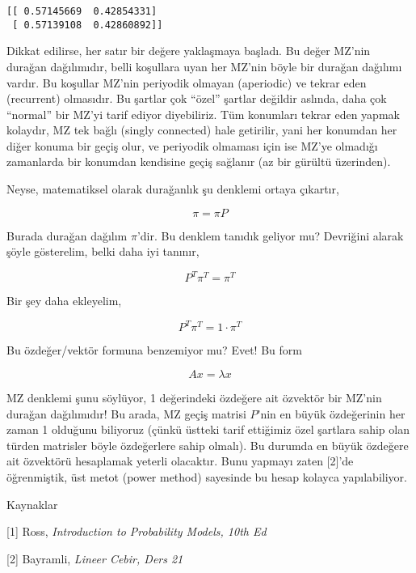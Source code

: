 \documentclass[12pt,fleqn]{article}\usepackage{../../common}
\begin{document}
\begin{verbatim}
[[ 0.57145669  0.42854331]
 [ 0.57139108  0.42860892]]
\end{verbatim}

Dikkat edilirse, her satır bir değere yaklaşmaya başladı. Bu değer MZ'nin
durağan dağılımıdır, belli koşullara uyan her MZ'nin böyle bir durağan
dağılımı vardır. Bu koşullar MZ'nin periyodik olmayan (aperiodic) ve tekrar
eden (recurrent) olmasıdır. Bu şartlar çok ``özel'' şartlar değildir
aslında, daha çok ``normal'' bir MZ'yi tarif ediyor diyebiliriz. Tüm
konumları tekrar eden yapmak kolaydır, MZ tek bağlı (singly connected) hale
getirilir, yani her konumdan her diğer konuma bir geçiş olur, ve periyodik
olmaması için ise MZ'ye olmadığı zamanlarda bir konumdan kendisine geçiş
sağlanır (az bir gürültü üzerinden). 

Neyse, matematiksel olarak durağanlık şu denklemi ortaya çıkartır,

$$ \pi = \pi P $$

Burada durağan dağılım $\pi$'dir. Bu denklem tanıdık geliyor mu?  Devriğini
alarak şöyle gösterelim, belki daha iyi tanınır, 

$$ P^T\pi^T = \pi^T $$

Bir şey daha ekleyelim, 

$$ P^T\pi^T = 1 \cdot \pi^T $$

Bu özdeğer/vektör formuna benzemiyor mu? Evet! Bu form 

$$ Ax = \lambda x $$

MZ denklemi şunu söylüyor, 1 değerindeki özdeğere ait özvektör bir MZ'nin
durağan dağılımıdır! Bu arada, MZ geçiş matrisi $P$'nin en büyük
özdeğerinin her zaman 1 olduğunu biliyoruz (çünkü üstteki tarif ettiğimiz
özel şartlara sahip olan türden matrisler böyle özdeğerlere sahip
olmalı). Bu durumda en büyük özdeğere ait özvektörü hesaplamak yeterli
olacaktır. Bunu yapmayı zaten [2]'de öğrenmiştik, üst metot (power method)
sayesinde bu hesap kolayca yapılabiliyor.



Kaynaklar

[1] Ross, {\em Introduction to Probability Models, 10th Ed}

[2] Bayramli, {\em Lineer Cebir, Ders 21}
\end{document}
